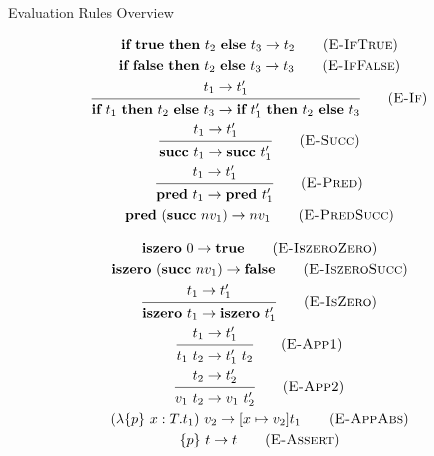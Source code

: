\documentclass[handout]{beamer}
\begin{document}
\begin{frame}[allowframebreaks]{Evaluation Rules Overview}

\begin{gather*}
    \textbf{if} \ \textbf{true} \ \textbf{then} \ t_2 \ \textbf{else} \ t_3 \to t_2
        \tag{\textsc{E-IfTrue}} \\
    \textbf{if} \ \textbf{false} \ \textbf{then} \ t_2 \ \textbf{else} \ t_3 \to t_3
        \tag{\textsc{E-IfFalse}} \\
    {\begin{prooftree}
        \hypo{t_1 \to t_1'}
        \infer1{ \textbf{if} \ t_1 \ \textbf{then} \ t_2 \ \textbf{else} \ t_3 \to \textbf{if} \ t_1' \ \textbf{then} \ t_2 \ \textbf{else} \ t_3 }
    \end{prooftree}} \tag{\textsc{E-If}} \\
    {\begin{prooftree}
        \hypo{t_1 \to t_1'}
        \infer1{ \textbf{succ} \ t_1 \to \textbf{succ} \ t_1' }
    \end{prooftree}} \tag{\textsc{E-Succ}} \\
    {\begin{prooftree}
        \hypo{t_1 \to t_1'}
        \infer1{ \textbf{pred} \ t_1 \to \textbf{pred} \ t_1' }
    \end{prooftree}} \tag{\textsc{E-Pred}} \\
    \textbf{pred} \ (\textbf{succ} \ nv_1) \to nv_1
        \tag{\textsc{E-PredSucc}}
\end{gather*}

\begin{gather*}
    \textbf{iszero} \ 0 \to \textbf{true}
        \tag{\textsc{E-IszeroZero}} \\
    \textbf{iszero} \ (\textbf{succ} \ nv_1) \to \textbf{false}
        \tag{\textsc{E-IszeroSucc}} \\
    {\begin{prooftree}
        \hypo{t_1 \to t_1'}
        \infer1{ \textbf{iszero} \ t_1 \to \textbf{iszero} \ t_1' }
    \end{prooftree}} \tag{\textsc{E-IsZero}} \\
    {\begin{prooftree}
        \hypo{t_1 \to t_1'}
        \infer1{ t_1 \ t_2 \to t_1' \ t_2 }
    \end{prooftree}} \tag{\textsc{E-App1}} \\
    {\begin{prooftree}
        \hypo{ t_2 \to t_2' }
        \infer1{ v_1 \ t_2 \to v_1 \ t_2' }
    \end{prooftree}} \tag{\textsc{E-App2}} \\
    (\lambda \qty{p} \ x : T . t_1) \ v_2 \to [x \mapsto v_2] t_1
        \tag{\textsc{E-AppAbs}} \\
    \qty{p} \ t \to t \tag{\textsc{E-Assert}}
\end{gather*}

\end{frame}
\end{document}
